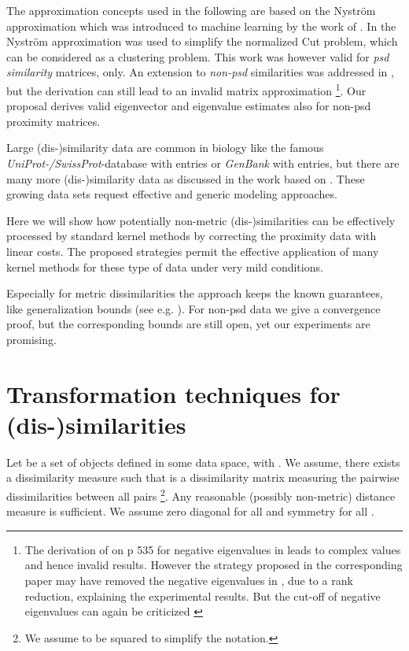 \documentclass[twoside,11pt]{article}
\begin{document}
The approximation concepts used in the following are based on the Nystr\"om approximation which was introduced to machine learning by the work of
\cite{DBLP:conf/nips/WilliamsS00}. In \cite{DBLP:journals/pami/FowlkesBCM04} the Nystr\"om approximation was used to simplify the normalized Cut
problem, which can be considered as a clustering problem. This work was however valid for \emph{psd similarity} matrices, only. An extension to
\emph{non-psd} similarities was addressed in \cite{DBLP:conf/eccv/BelongieFCM02}, but the derivation can still lead to an invalid matrix approximation
\footnote{The derivation of  on p 535 for negative eigenvalues in  leads to complex values and hence invalid results.
However the strategy proposed in the corresponding paper may have removed the negative eigenvalues in , due to a rank reduction,
explaining the experimental results. But the cut-off of negative eigenvalues can again be criticized \cite{DBLP:conf/sspr/PekalskaDGB04}}. 
Our proposal derives valid eigenvector and eigenvalue estimates also for non-psd proximity matrices.

Large (dis-)similarity data are common in biology like the famous
\emph{UniProt-/SwissProt}-database with  entries
or \emph{GenBank} with  entries, but there are many more (dis-)similarity data as discussed in the work based 
on \cite{Pekalska2005a,DBLP:journals/tsmc/PekalskaD08}. These growing data sets request effective and generic modeling approaches.

Here we will show how potentially non-metric (dis-)simi\-larities can be effectively processed by standard kernel methods by
correcting the proximity data with linear costs.
The proposed strategies permit the effective application of many kernel methods for these type of data under very mild conditions. 

Especially for metric dissimilarities the approach keeps the known guarantees, like generalization bounds (see e.g. \cite{DBLP:journals/jmlr/DrineasM05}).
For non-psd data we give a convergence proof, but the corresponding bounds are still open, yet our experiments are promising.

\section{Transformation techniques for (dis-)similarities}
\label{sec:trafos}
Let  be a set of objects defined in some data space, with . 
We assume, there exists a dissimilarity measure such that  is a dissimilarity matrix 
measuring the pairwise dissimilarities 
between all pairs 
\footnote{We assume  to be squared to simplify the notation.}.
Any reasonable (possibly non-metric) distance measure  is sufficient. 
We assume zero diagonal  for all  and symmetry 
for all .
\end{document}
